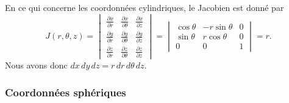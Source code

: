 En ce qui concerne les coordonnées cylindriques, le Jacobien est donné par
\begin{equation}
    J(r,\theta,z)=\begin{vmatrix}
        \frac{ \partial x }{ \partial r }    &   \frac{ \partial x }{ \partial \theta }    &   \frac{ \partial x }{ \partial z }    \\
        \frac{ \partial y }{ \partial r }    &   \frac{ \partial y }{ \partial \theta }    &   \frac{ \partial y }{ \partial z }    \\
        \frac{ \partial z }{ \partial r }    &   \frac{ \partial z }{ \partial \theta }    &   \frac{ \partial z }{ \partial z }    
    \end{vmatrix}=
    \begin{vmatrix}
        \cos\theta    &   -r\sin\theta    &   0    \\
        \sin\theta    &   r\cos\theta    &   0    \\
        0    &   0    &   1
    \end{vmatrix}=r.
\end{equation}
Nous avons donc $dx\,dy\,dz=r\,dr\,d\theta\,dz$.

\subsubsection{Coordonnées sphériques}

